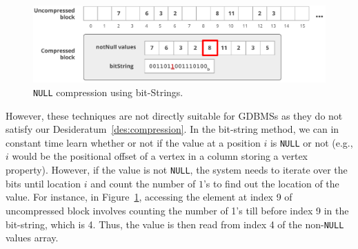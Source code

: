 \begin{figure}
	\hfill\includegraphics[scale=0.70]{img/null1}\hspace*{\fill}
	\captionsetup{justification=centering}
	\caption{\texttt{NULL} compression using bit-Strings.}
	\label{fig:null1}
\end{figure}


However, these techniques are not directly suitable for GDBMSs as they do not satisfy our Desideratum~\ref{des:compression}. In the bit-string method, we can in constant time learn whether or not if the value at a position $i$ is \texttt{NULL} or not (e.g., $i$ would be the positional offset of a vertex in a column storing a vertex property). However, if the value is not \texttt{NULL}, the system needs to iterate over the bits until location $i$ and count the number of $1$'s to find out the location of the value. For instance, in Figure~\ref{fig:null1}, accessing the element at index 9 of uncompressed block involves counting the number of 1's till before index 9 in the bit-string, which is 4. Thus, the value is then read from index 4 of the non-\texttt{NULL} values array. 


